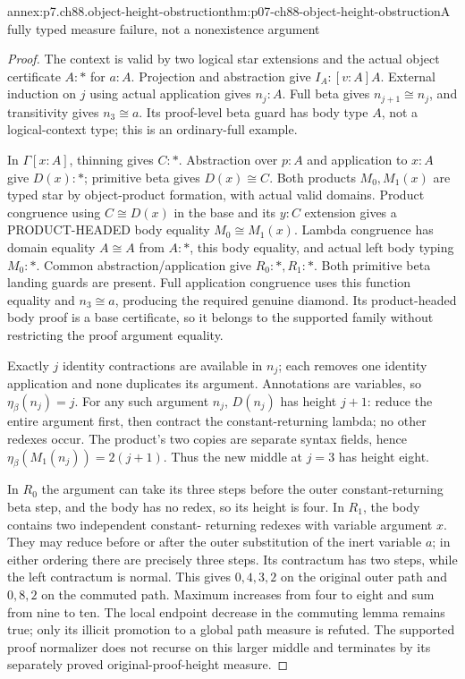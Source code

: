 \begin{annexitem}{annex:p7.ch88.object-height-obstruction}{thm:p07-ch88-object-height-obstruction}{A fully typed measure failure, not a nonexistence argument}
\begin{proof}
The context is valid by two logical star extensions and the actual
object certificate \(A:\ast\) for \(a:A\). Projection and
abstraction give \(I_A:[v:A]A\). External induction on \(j\)
using actual application gives \(n_j:A\). Full beta gives
\(n_{j+1}\cong n_j\), and transitivity gives \(n_3\cong a\).
Its proof-level beta guard has body type \(A\), not a logical-context
type; this is an ordinary-full example.

In \(\Gamma[x:A]\), thinning gives \(C:\ast\). Abstraction
over \(p:A\) and application to \(x:A\) give \(D(x):\ast\);
primitive beta gives \(D(x)\cong C\). Both products \(M_0,M_1(x)\)
are typed star by object-product formation, with actual valid domains.
Product congruence using \(C\cong D(x)\) in the base and its
\(y:C\) extension gives a PRODUCT-HEADED body equality
\(M_0\cong M_1(x)\). Lambda congruence has domain equality
\(A\cong A\) from \(A:\ast\), this body equality, and actual
left body typing \(M_0:\ast\). Common abstraction/application give
\(R_0:\ast,R_1:\ast\). Both primitive beta landing guards are
present. Full application congruence uses this function equality
and \(n_3\cong a\), producing the required genuine diamond.
Its product-headed body proof is a base certificate, so it belongs
to the supported family without restricting the proof argument equality.

Exactly \(j\) identity contractions are available in \(n_j\);
each removes one identity application and none duplicates its argument.
Annotations are variables, so \(\eta_\beta(n_j)=j\).
For any such argument \(n_j\), \(D(n_j)\) has height \(j+1\):
reduce the entire argument first, then contract the constant-returning
lambda; no other redexes occur. The product's two copies are separate
syntax fields, hence \(\eta_\beta(M_1(n_j))=2(j+1)\).
Thus the new middle at \(j=3\) has height eight.

In \(R_0\) the argument can take its three steps before the outer
constant-returning beta step, and the body has no redex, so its height
is four. In \(R_1\), the body contains two independent constant-
returning redexes with variable argument \(x\). They may reduce
before or after the outer substitution of the inert variable \(a\);
in either ordering there are precisely three steps. Its contractum
has two steps, while the left contractum is normal. This gives
\(0,4,3,2\) on the original outer path and \(0,8,2\) on the
commuted path. Maximum increases from four to eight and sum from nine
to ten. The local endpoint decrease in the commuting lemma remains
true; only its illicit promotion to a global path measure is refuted.
The supported proof normalizer does not recurse on this larger middle
and terminates by its separately proved original-proof-height measure.
\end{proof}
\end{annexitem}
